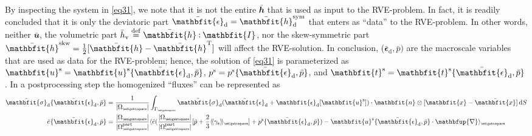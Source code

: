 \documentclass[12pt,a4paper]{article}
\renewcommand{\ta}[1]{\mathbfit{#1}}
\renewcommand{\ts}[1]{\mathbfit{#1}}
\renewcommand{\tf}[1]{\mathbfsfup{#1}}
\renewcommand{\diff}{\mathbfup{\nabla}}
\renewcommand{\Box}{\mdlgwhtsquare}
\DeclarePairedDelimiter{\homgen}{\langle}{\rangle_\rve}
\DeclarePairedDelimiter{\shomgen}{\langle\!\langle}{\rangle\!\rangle_\rve}
\renewcommand{\dev}{\mathrm{d}}
\renewcommand{\vol}{\mathrm{v}}
\newcommand{\volume}{|\Omega_\rve|}
\newcommand{\surf}{\mathrm{s}}
\newcommand{\particle}{\mathrm{part}}
\newcommand{\epspargs}{\{{\bar{\ts\epsilon}}_\dev, \bar{p}\}}
\newcommand{\rve}{
  {\mathchoice
   {\mbox{\scalebox{0.67}{$\Box$}}}
   {\mbox{\scalebox{0.67}{$\Box$}}}
   {\mbox{\scalebox{0.5}{$\Box$}}}
   {\mbox{\scalebox{0.375}{$\Box$}}}
  }
}
\begin{document}
By inspecting the system in \cref{eq31}, we note that it is not the entire $\bar{\ts{h}}$ that is used as input to the RVE-problem.
In fact, it is readily concluded that it is only the deviatoric part $\bar{\ts\epsilon}_\dev=\bar{\ts{h}}^\sym_\dev$ that enters as ``data'' to the RVE-problem.
In other words, neither $\bar{\ta{u}}$, the volumetric part $\bar{h}_\vol\defeq\bar{\ts{h}}\dprod\ts{I}$, nor the skew-symmetric part $\bar{\ts{h}}^\skw=\frac{1}{2}[\bar{\ts{h}}-\bar{\ts{h}}^\majorT]$ will affect the RVE-solution.
In conclusion, ($\bar{\ts\epsilon}_\dev,\bar{p})$ are the macroscale variables that are used as data for the RVE-problem; hence, the solution of \cref{eq31} is parameterized as $\ta{u}^\fluct=\ta{u}^\fluct\epspargs$, $p^\fluct=p^\fluct\epspargs$, and $\ta{t}^\fluct=\ta{t}^\fluct\epspargs$.
In a postprocessing step the homogenized ``fluxes'' can be represented as
\begin{align}
    \bar{\ts\sigma}_\dev\epspargs &=
    \frac{1}{\volume}\int_{\Gamma_\rve} \hat{\ts\sigma}_\dev(\bar{\ts\epsilon}_\dev + \ts\epsilon_\dev[\ta u^\fluct])\cdot\ta n \outerp[\ta x-\bar{\ta x}] \dif S
\label{eq33a} \\
    \bar{e}\epspargs &=
    \frac{|\Omega_\rve|}{|\Omega_\rve^\particle|}\homgen{ \hat{e}(\frac{|\Omega_\rve|}{|\Omega_\rve^\particle|} [\bar{p} + \frac23 \shomgen{\gamma_\surf}] + p^\fluct\epspargs) - \ta u^\fluct\epspargs\cdot\diff}
\label{eq33b}
\end{align}
\end{document}
